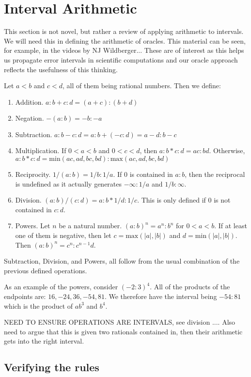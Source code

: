 \documentclass[12pt]{article}
\theoremstyle{remark}
\begin{document}
\section{Interval Arithmetic}

This section is not novel, but rather a review of applying arithmetic to intervals. We will need this in defining the arithmetic of oracles. This material can be seen, for example, in the videos by NJ Wildberger... These are of interest as this helps us propagate error intervals in scientific computations and our oracle approach reflects the usefulness of this thinking. 

Let $a<b$ and $c<d$, all of them being rational numbers. Then we define:
\begin{enumerate}
    \item Addition. $a:b + c:d = (a+c):(b+d)$
    \item Negation. $-(a:b) = -b:-a$
    \item Subtraction. $a:b - c:d = a:b + (-c:d) = a-d:b-c$
    \item Multiplication. If $0<a<b$ and $0<c<d$, then $a:b*c:d = ac:bd$. Otherwise, $a:b * c:d = \mathrm{min}(ac, ad, bc, bd): \mathrm{max}(ac,ad,bc,bd)$
    \item Reciprocity. $1/(a:b) = 1/b:1/a$. If 0 is contained in $a:b$, then the reciprocal is undefined as it actually generates $-\infty:1/a$ and $1/b:\infty$. 
    \item Division. $(a:b) / (c:d) = a:b * 1/d:1/c$. This is only defined if 0 is not contained in $c:d$.
    \item Powers. Let $n$ be a natural number. $(a:b)^n = a^n:b^n$ for $0 < a < b$. If at least one of them is negative, then let $c = \mathrm{max} (|a|, |b|)$ and $d=\mathrm{min}(|a|, |b|)$. Then $(a:b)^n = c^n: c^{n-1}d$. 
\end{enumerate}

Subtraction, Division, and Powers, all follow from the usual combination of the previous defined operations. 

As an example of the powers, consider $(-2:3)^4$. All of the products of the endpoints are: $16, -24, 36, -54, 81$. We therefore have the interval being $-54:81$ which is the product of $ab^3$ and $b^4$. 

NEED TO ENSURE OPERATIONS ARE INTERVALS, see division ....  
Also need to argue that this is given two rationals contained in, then their arithmetic gets into the right interval. 

\subsection{Verifying the rules}
\end{document}
